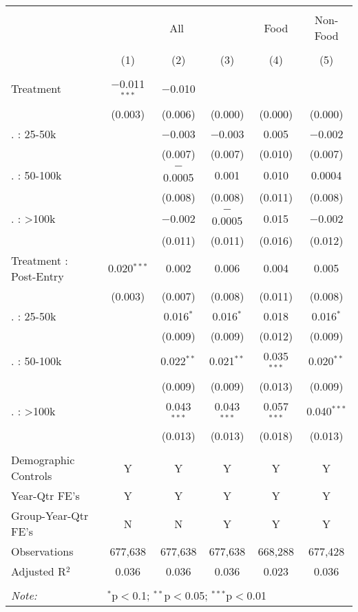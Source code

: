 
\begin{table}[!htbp] \centering 
  \caption{} 
  \label{} 
\begin{tabular}{@{\extracolsep{5pt}}lccccc} 
\\[-1.8ex]\hline 
\hline \\[-1.8ex] 
 & \multicolumn{3}{c}{All} & Food & Non-Food \\ 
\\[-1.8ex] & (1) & (2) & (3) & (4) & (5)\\ 
\hline \\[-1.8ex] 
 Treatment & $-$0.011$^{***}$ & $-$0.010 &  &  &  \\ 
  & (0.003) & (0.006) & (0.000) & (0.000) & (0.000) \\ 
   . : 25-50k &  & $-$0.003 & $-$0.003 & 0.005 & $-$0.002 \\ 
  &  & (0.007) & (0.007) & (0.010) & (0.007) \\ 
   . : 50-100k &  & $-$0.0005 & 0.001 & 0.010 & 0.0004 \\ 
  &  & (0.008) & (0.008) & (0.011) & (0.008) \\ 
   . : >100k &  & $-$0.002 & $-$0.0005 & 0.015 & $-$0.002 \\ 
  &  & (0.011) & (0.011) & (0.016) & (0.012) \\ 
  Treatment : Post-Entry & 0.020$^{***}$ & 0.002 & 0.006 & 0.004 & 0.005 \\ 
  & (0.003) & (0.007) & (0.008) & (0.011) & (0.008) \\ 
   . : 25-50k &  & 0.016$^{*}$ & 0.016$^{*}$ & 0.018 & 0.016$^{*}$ \\ 
  &  & (0.009) & (0.009) & (0.012) & (0.009) \\ 
   . : 50-100k &  & 0.022$^{**}$ & 0.021$^{**}$ & 0.035$^{***}$ & 0.020$^{**}$ \\ 
  &  & (0.009) & (0.009) & (0.013) & (0.009) \\ 
   . : >100k &  & 0.043$^{***}$ & 0.043$^{***}$ & 0.057$^{***}$ & 0.040$^{***}$ \\ 
  &  & (0.013) & (0.013) & (0.018) & (0.013) \\ 
 \hline \\[-1.8ex] 
Demographic Controls & Y & Y & Y & Y & Y \\ 
Year-Qtr FE's & Y & Y & Y & Y & Y \\ 
Group-Year-Qtr FE's & N & N & Y & Y & Y \\ 
Observations & 677,638 & 677,638 & 677,638 & 668,288 & 677,428 \\ 
Adjusted R$^{2}$ & 0.036 & 0.036 & 0.036 & 0.023 & 0.036 \\ 
\hline 
\hline \\[-1.8ex] 
\textit{Note:}  & \multicolumn{5}{l}{$^{*}$p$<$0.1; $^{**}$p$<$0.05; $^{***}$p$<$0.01} \\ 
\end{tabular} 
\end{table} 
